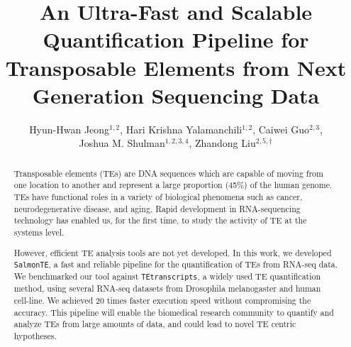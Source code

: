 \documentclass[wsdraft]{ws-procs11x85}
\newcommand{\TEtranscripts}{\texttt{TEtranscripts}}
\newcommand{\SalmonTE}{\texttt{SalmonTE}}
\begin{document}
\title{An Ultra-Fast and Scalable Quantification Pipeline for Transposable Elements from Next Generation Sequencing Data}

\author{Hyun-Hwan Jeong$^{1,2}$, Hari Krishna Yalamanchili$^{1,2}$, Caiwei Guo$^{2,3}$, \\
Joshua M. Shulman$^{1,2,3,4}$, Zhandong Liu$^{2,5,\dag}$}

\address{$^{1}$Department of Molecular and Human Genetics, Baylor College of Medicine,\\
$^{2}$Jan and Dan Duncan Neurological Research Institute, Texas Children’s Hospital,\\
$^{3}$Department of Neuroscience, Baylor College of Medicine,\\
$^{4}$Department of Neurology, Baylor College of Medicine,\\
$^{5}$Department of Pediatrics, Baylor College of Medicine,\\
Houston, Texas 77030, USA\\
$^{\dag}$E-mail: zhandonl@bcm.edu}

\begin{abstract}

Transposable elements (TEs) are DNA sequences 
which are capable of moving from one location to another
and represent a large proportion (45\%) of the human genome. 
TEs have functional roles
in a variety of biological phenomena such as
cancer,
neurodegenerative disease, and aging.
Rapid development in RNA-sequencing technology has enabled us, for the first time, to study the activity of TE at the systems level.  


However, efficient TE analysis tools are not yet developed.
In this work, we developed \SalmonTE, a fast and reliable pipeline for the quantification of TEs from 
RNA-seq data.
We benchmarked our tool against \TEtranscripts, a widely used TE quantification method, using several RNA-seq datasets from
Drosophila melanogaster
and human cell-line.
We achieved 20 times faster execution speed without compromising the accuracy.
This pipeline will enable the biomedical research community to quantify and analyze TEs from large amounts of data, and could lead to novel TE centric hypotheses.


\end{abstract}


\end{document}
